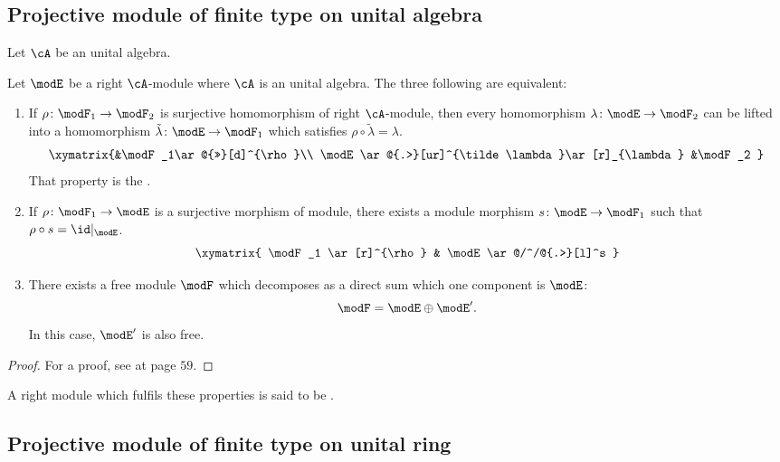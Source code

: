 \subsection{Projective module of finite type on unital algebra}

Let $\cA$ be an unital algebra.

\begin{proposition}		\label{PropEquivProjModule}
Let $\modE$ be a right $\cA$-module where $\cA$ is an unital algebra. The three following are equivalent:
\begin{enumerate}
\item If $\rho\colon \modF_1\to \modF_2$ is surjective homomorphism of right $\cA$-module, then every homomorphism $\lambda\colon \modE\to \modF_2$ can be lifted into a homomorphism $\tilde\lambda\colon \modE\to \modF_1$ which satisfies $\rho\circ\tilde\lambda=\lambda$. 
\begin{equation}  \label{eq_diag_proj_mod}
\xymatrix{%
            &\modF_1\ar@{>>}[d]^{\rho}\\
\modE \ar@{.>}[ur]^{\tilde\lambda}\ar[r]_{\lambda} &\modF_2
}
\end{equation}
That property is the .

\item\label{ItemTroisCarecterisationProjectif} If $\rho\colon\modF_1\to \modE$ is a surjective morphism of module, there exists a module morphism $s\colon \modE\to \modF_1$ such that $\rho\circ s=\id|_{\modE}$. 
\[ 
    \xymatrix{ \modF_1 \ar[r]^{\rho} & \modE \ar@/^/@{.>}[l]^s }
\]

\item \label{prop_def_proj_module_iii}  There exists a free module $\modF$ which decomposes as a direct sum which one component is $\modE$:
\[ 
  \modF=\modE\oplus\modE'.
\]
In this case, $\modE'$ is also free.

\end{enumerate}
\label{prop_def_proj_module}
\end{proposition}

\begin{proof}
For a proof, see \cite{Landi} at page $59$.
\end{proof}

A right module which fulfils these properties is said to be .

\subsection{Projective module of finite type on unital ring}

